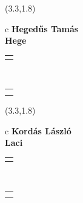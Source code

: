 \documentclass[11pt]{article}
\begin{document}
\makebox(3.3,1.8){
  \renewcommand\arraystretch{1.3}
  \begin{tabular}[c]{c}
    \hspace{8.5mm}
    \LARGE\bf{ Hegedűs Tamás }\\
    \hspace{8.5mm}
    \Large{ Hege }\\
    \renewcommand\arraystretch{3}
    \begin{tabular}[c]{c}
      \centering
      \fontfamily{phv}\selectfont{
        \textbf{
          \textsc{
            \scriptsize{
            \color{Dark}{ Ismerkedő }\color{Bright}{ Webmester }\color{Bright}{ Sminkmester }\color{Bright}{ Programozó }
            }
          }
        }
      }
    \end{tabular}
    \\
    \renewcommand\arraystretch{1}
    \begin{tabular}{p{3.3in}}
      \hspace{.7cm}\\
      \hspace{.7cm}\emph{  }\\
    \end{tabular}
  \end{tabular}
}

\makebox(3.3,1.8){
  \renewcommand\arraystretch{1.3}
  \begin{tabular}[c]{c}
    \hspace{8.5mm}
    \LARGE\bf{ Kordás László }\\
    \hspace{8.5mm}
    \Large{ Laci }\\
    \renewcommand\arraystretch{3}
    \begin{tabular}[c]{c}
      \centering
      \fontfamily{phv}\selectfont{
        \textbf{
          \textsc{
            \scriptsize{
            \color{Dark}{ Ismerkedő }\color{Bright}{ Webmester }\color{Bright}{ Sminkmester }\color{Bright}{ Programozó }
            }
          }
        }
      }
    \end{tabular}
    \\
    \renewcommand\arraystretch{1}
    \begin{tabular}{p{3.3in}}
      \hspace{.7cm}\\
      \hspace{.7cm}\emph{  }\\
    \end{tabular}
  \end{tabular}
}
\end{document}
